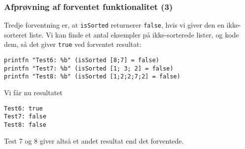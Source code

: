 \documentclass{beamer}
\begin{document}
\begin{frame}[fragile=singleslide]
\frametitle{Afprøvning af forventet funktionalitet (3)}

Tredje forventning er, at \texttt{isSorted} returnerer \texttt{false},
hvis vi giver den en ikke-sorteret liste.  Vi kan finde et antal
eksempler på ikke-sorterede lister, og kode dem, så det giver
\texttt{true} ved forventet resultat:

{\small
\begin{verbatim}
printfn "Test6: %b" (isSorted [8;7] = false)
printfn "Test7: %b" (isSorted [1; 3; 2] = false)
printfn "Test8: %b" (isSorted [1;2;2;7;2] = false)
\end{verbatim}
}

Vi får nu resultatet

{\small
\begin{verbatim}
Test6: true
Test7: false
Test8: false
\end{verbatim}
}

Test 7 og 8 giver altså et andet resultat end det forventede.

\end{frame}

\end{document}
